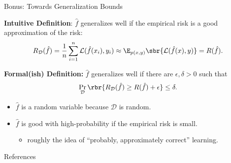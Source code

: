 \documentclass[notheorems]{beamer}
\begin{document}
    \begin{frame}{Bonus: Towards Generalization Bounds}

        \textbf{Intuitive Definition}: $\hat f$ generalizes well if the empirical risk is a good approximation of the risk:
        \[ R_{\mathcal{D}}(\hat f) =  \frac{1}{n} \sum_{i=1}^n \mathcal{L}(\hat f(x_i), y_i) \approx \E_{p(x,y)} \sbr{\mathcal{L}(\hat f(x), y)} = R(\hat f). \]

        \textbf{Formal(ish) Definition:} $\hat f$ generalizes well if there are $\epsilon, \delta > 0$ such that
        \[ \Pr_{\mathcal{D}}\rbr{R_{\mathcal{D}}(\hat f) \geq R(\hat f) + \epsilon} \leq \delta. \]

        \begin{itemize}
            \item $\hat f$ is a random variable because $\mathcal{D}$ is random.
            \item $\hat f$ is good with high-probability if the empirical risk is small.
            \begin{itemize}
                \item roughly the idea of ``probably, approximately correct'' learning.
            \end{itemize}
        \end{itemize}

    \end{frame}


    \begin{frame}[allowframebreaks]{References}
        
        
    \end{frame}
\end{document}
